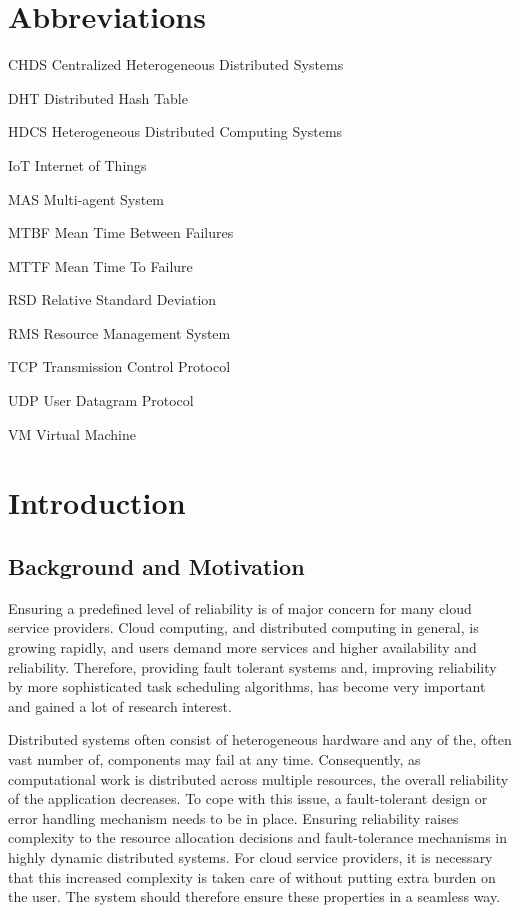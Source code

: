 \documentclass{cslthse-msc}
\newcommand{\abbrlabel}[1]{\makebox[3cm][l]{\textbf{#1}\ }}
\newenvironment{abbreviations}{\begin{list}{}{\renewcommand{\makelabel}{\abbrlabel}}}{\end{list}}
\begin{document}
\chapter*{Abbreviations}
\begin{abbreviations}
\item[CHDS] Centralized Heterogeneous Distributed Systems
\item[DHT] Distributed Hash Table
\item[HDCS] Heterogeneous Distributed Computing Systems
\item[IoT] Internet of Things
\item[MAS] Multi-agent System
\item[MTBF] Mean Time Between Failures
\item[MTTF] Mean Time To Failure
\item[RSD] Relative Standard Deviation
\item[RMS] Resource Management System
\item[TCP] Transmission Control Protocol
\item[UDP] User Datagram Protocol
\item[VM] Virtual Machine
\end{abbreviations}

\chapter{Introduction} \label{ch:introduction} 
\section{Background and Motivation} \label{sec:introduction_backgroud_motivation}
Ensuring a predefined level of reliability is of major concern for many cloud service providers. Cloud computing, and distributed computing in general, is growing rapidly, and users demand more services and higher availability and reliability. Therefore, providing fault tolerant systems and, improving reliability by more sophisticated task scheduling algorithms, has become very important and gained a lot of research interest.

Distributed systems often consist of heterogeneous hardware and any of the, often vast number of, components may fail at any time. Consequently, as computational work is distributed across multiple resources, the overall reliability of the application decreases. To cope with this issue, a fault-tolerant design or error handling mechanism needs to be in place. Ensuring reliability raises complexity to the resource allocation decisions and fault-tolerance mechanisms in highly dynamic distributed systems. For cloud service providers, it is necessary that this increased complexity is taken care of without putting extra burden on the user. The system should therefore ensure these properties in a seamless way.
\end{document}
